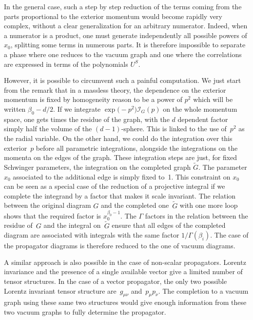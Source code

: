 \documentclass[11pt]{article}
\numberwithin{equation}{section}
\def\cI{{\mathcal I}}
\begin{document}
In the general case, such a step by step reduction of the terms coming from the parts proportional to the
exterior momentum would become rapidly very complex, without a clear generalization for an arbitrary
numerator. Indeed, when a numerator is a product, one must generate independently all possible powers of
$x_0$, splitting some terms in numerous parts. It is therefore impossible to separate a phase where one
reduces to the vacuum graph and one where the correlations are expressed in terms of the polynomials $U^S$.

However, it is possible to circumvent such a painful computation. We just start from the remark that
in a massless theory, the dependence on the exterior momentum is fixed by homogeneity reason to be a
power of $p^2$ which will be written $\beta_0 - d/2$. If we integrate $\exp\bigl(-p^2\bigr) \cI_G(p)$ on the
whole momentum space, one gets  times the residue of the
graph, with the $d$ dependent factor simply half the volume of the $(d-1)$-sphere. This is linked to the use of~$p^2$ as the radial variable.
On the other hand, we could do the integration over this exterior~$p$ before all parametric
integrations, alongside the integrations on the momenta on the edges of the graph. These integration steps are just, for fixed Schwinger
parameters, the integration on the
completed graph $\tilde G$.
The parameter $x_0$ associated to the additional edge is simply fixed to~1. This constraint on $x_0$ can be
seen as a special case of the reduction of a projective integral if we complete the integrand
by a factor that makes it scale invariant. The relation between the original diagram $G$ and the completed one~$\tilde
G$ with one more loop shows that the required factor is $x_0^{\beta_0-1}$. The $\Gamma$ factors in the relation
between the residue of~$G$ and the integral on~$\tilde G$ ensure that all edges of the completed diagram are associated
with integrals with the same factor $1/\Gamma(\beta_i)$. The case of the propagator
diagrams is therefore reduced to the one of vacuum diagrams.

A similar approach is also possible in the case of non-scalar propagators. Lorentz invariance and
the presence of a single available vector give a limited number of tensor structures. In the case of a vector propagator, the only two possible
Lorentz invariant tensor structure are~$g_{\mu\nu}$ and~$p_\mu p_\nu$. The completion to a vacuum graph using these same two structures
would give enough information from these two vacuum graphs to fully determine the propagator.
\end{document}
